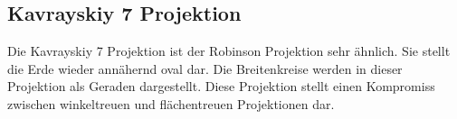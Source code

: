 \subsection{Kavrayskiy 7 Projektion}
\label{sec:kravrayskiy}
Die Kavrayskiy 7 Projektion ist der Robinson Projektion sehr ähnlich. Sie stellt die Erde wieder annähernd oval dar. Die Breitenkreise werden in dieser Projektion als Geraden dargestellt. Diese Projektion stellt einen Kompromiss zwischen winkeltreuen und flächentreuen Projektionen dar.